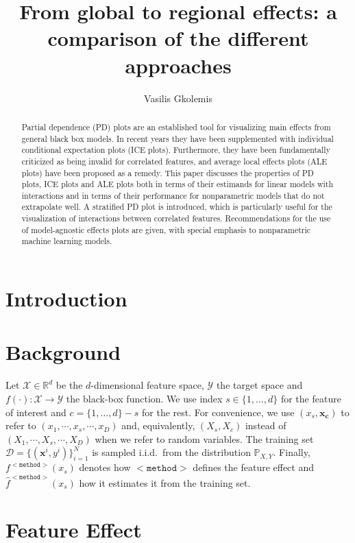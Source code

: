 \documentclass[12pt]{article}
\title{From global to regional effects: a comparison of the different approaches}
\author{Vasilis Gkolemis}
\newcommand{\Rd}{\mathbb{R}^d}
\newcommand{\xb}{\mathbf{x}}
\newcommand{\xc}{\mathbf{x_c}}
\newcommand{\Xcal}{\mathcal{X}}
\newcommand{\Ycal}{\mathcal{Y}}
\begin{document}
\maketitle

\begin{abstract}
Partial dependence (PD) plots are an established tool for visualizing main effects from general black box
models. In recent years they have been supplemented with individual conditional expectation plots (ICE
plots). Furthermore, they have been fundamentally criticized as being invalid for correlated features,
and average local effects plots (ALE plots) have been proposed as a remedy. This paper discusses the
properties of PD plots, ICE plots and ALE plots both in terms of their estimands for linear models with
interactions and in terms of their performance for nonparametric models that do not extrapolate well. A
stratified PD plot is introduced, which is particularly useful for the visualization of interactions between
correlated features. Recommendations for the use of model-agnostic effects plots are given, with special
emphasis to nonparametric machine learning models.
\end{abstract}

\section{Introduction}

\section{Background}

Let \(\Xcal \in \Rd\) be the \(d\)-dimensional feature space, \(\Ycal\) the target space and \(f(\cdot) : \Xcal \rightarrow \Ycal\) the black-box function.  We use index \(s \in \{1, \ldots, d\}\) for the feature of interest and \(c = \{1, \ldots, d\} - s\) for the rest.
For convenience, we use \((x_s, \xc)\) to refer to \((x_1, \cdots , x_s, \cdots, x_D)\) and, equivalently, \((X_s, X_c)\) instead of \((X_1, \cdots , X_s, \cdots, X_D)\) when we refer to random variables.
The training set \(\mathcal{D} = \{(\xb^i, y^i)\}_{i=1}^N\) is sampled
i.i.d.\ from the distribution \(\mathbb{P}_{X,Y}\).  Finally,
\(f^{\mathtt{<method>}}(x_s)\) denotes how \(\mathtt{<method>}\)
defines the feature effect and \(\hat{f}^{\mathtt{<method>}}(x_s)\)
how it estimates it from the training set.

\section{Feature Effect}
\end{document}
